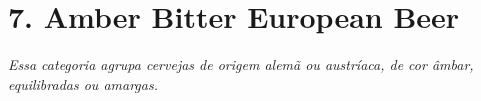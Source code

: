 \section*{7. Amber Bitter European Beer}
\textit{Essa categoria agrupa cervejas de origem alemã ou austríaca, de cor âmbar, equilibradas ou amargas.}